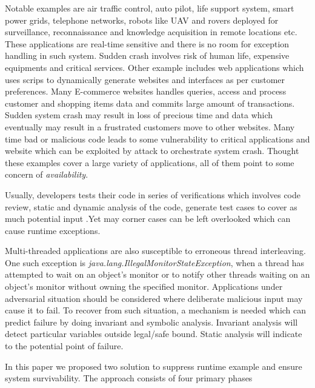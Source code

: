 Notable examples are air traffic control, auto pilot, life support system, smart
power grids, telephone networks, robots like UAV and rovers deployed for
surveillance, reconnaissance and knowledge acquisition in remote locations etc.
These applications are real-time sensitive and there is no room for exception
handling in such system.
Sudden crash involves risk of human life, expensive equipments and critical
services.
Other example includes web applications which uses scrips to dynamically
generate websites and interfaces as per customer preferences.
Many E-commerce websites handles queries, access and process customer and
shopping items data and commits large amount of transactions.
Sudden system crash may result in loss of precious time and data which
eventually may result in a frustrated customers move to other websites.
Many time bad or malicious code leads to some vulnerability to critical
applications and website which can be exploited by attack to orchestrate system
crash. Thought these examples cover a large variety of applications, all of them
point to some concern of \emph{availability}.

Usually, developers tests their code in series of verifications which involves
code review, static and dynamic analysis of the code, generate test cases to
cover as much potential input .Yet may corner cases can be left overlooked which
can cause runtime exceptions.

Multi-threaded applications are also susceptible to erroneous thread
interleaving. One such exception is
\emph{java.lang.IllegalMonitorStateException}, when a thread has attempted to
wait on an object's monitor or to notify other threads waiting on an object's
monitor without owning the specified monitor. Applications under adversarial
situation should be considered where deliberate malicious input may cause it to
fail. To recover from such situation, a mechanism is needed which can predict
failure by doing invariant and symbolic analysis. Invariant analysis will detect
particular variables outside legal/safe bound. Static analysis will indicate
to the potential point of failure.


In this paper we proposed two solution to suppress runtime example and ensure
system survivability. The approach consists of four primary phases

